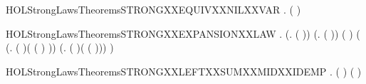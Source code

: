 \begin{SaveVerbatim}{HOLStrongLawsTheoremsSTRONGXXEQUIVXXNILXXVAR}
\HOLTokenTurnstile{} \HOLSymConst{\HOLTokenForall{}}.   ( )
\end{SaveVerbatim}
\newcommand{\HOLStrongLawsTheoremsSTRONGXXEQUIVXXNILXXVAR}{\UseVerbatim{HOLStrongLawsTheoremsSTRONGXXEQUIVXXNILXXVAR}}
\begin{SaveVerbatim}{HOLStrongLawsTheoremsSTRONGXXEXPANSIONXXLAW}
\HOLTokenTurnstile{} \HOLSymConst{\HOLTokenForall{}}   .
       (\HOLSymConst{\HOLTokenForall{}}.  \HOLSymConst{\HOLTokenLeq{}}  \HOLSymConst{\HOLTokenImp{}}  ( )) \HOLSymConst{\HOLTokenConj{}}
       (\HOLSymConst{\HOLTokenForall{}}.  \HOLSymConst{\HOLTokenLeq{}}  \HOLSymConst{\HOLTokenImp{}}  ( )) \HOLSymConst{\HOLTokenImp{}}
        (   \HOLSymConst{\ensuremath{\parallel}}   )
         (
            (\HOLTokenLambda{}.  ( )( ( ) \HOLSymConst{\ensuremath{\parallel}}   ))
             \HOLSymConst{\ensuremath{+}}
            (\HOLTokenLambda{}.  ( )(   \HOLSymConst{\ensuremath{\parallel}}  ( )))
             \HOLSymConst{\ensuremath{+}}     )
\end{SaveVerbatim}
\newcommand{\HOLStrongLawsTheoremsSTRONGXXEXPANSIONXXLAW}{\UseVerbatim{HOLStrongLawsTheoremsSTRONGXXEXPANSIONXXLAW}}
\begin{SaveVerbatim}{HOLStrongLawsTheoremsSTRONGXXLEFTXXSUMXXMIDXXIDEMP}
\HOLTokenTurnstile{} \HOLSymConst{\HOLTokenForall{}}  .  ( \HOLSymConst{\ensuremath{+}}  \HOLSymConst{\ensuremath{+}}  \HOLSymConst{\ensuremath{+}} ) ( \HOLSymConst{\ensuremath{+}}  \HOLSymConst{\ensuremath{+}} )
\end{SaveVerbatim}
